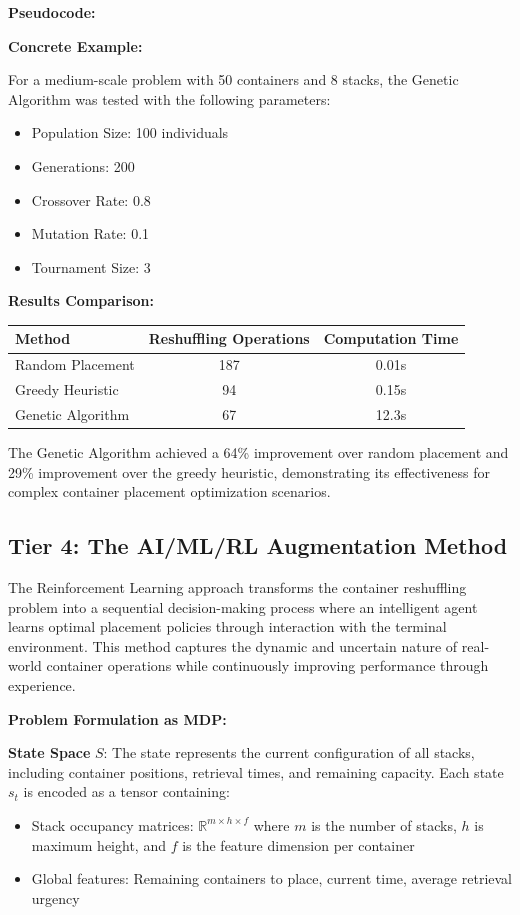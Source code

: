 \documentclass{article}
\begin{document}
\textbf{Pseudocode:}



\textbf{Concrete Example:}

For a medium-scale problem with 50 containers and 8 stacks, the Genetic Algorithm was tested with the following parameters:

\begin{itemize}
\item Population Size: 100 individuals
\item Generations: 200
\item Crossover Rate: 0.8
\item Mutation Rate: 0.1
\item Tournament Size: 3
\end{itemize}

\textbf{Results Comparison:}

\begin{center}
\begin{tabular}{lcc}
\toprule
Method & Reshuffling Operations & Computation Time \\
\midrule
Random Placement & 187 & 0.01s \\
Greedy Heuristic & 94 & 0.15s \\
Genetic Algorithm & 67 & 12.3s \\
\bottomrule
\end{tabular}
\end{center}

The Genetic Algorithm achieved a 64\% improvement over random placement and 29\% improvement over the greedy heuristic, demonstrating its effectiveness for complex container placement optimization scenarios.

\subsection{Tier 4: The AI/ML/RL Augmentation Method}

The Reinforcement Learning approach transforms the container reshuffling problem into a sequential decision-making process where an intelligent agent learns optimal placement policies through interaction with the terminal environment. This method captures the dynamic and uncertain nature of real-world container operations while continuously improving performance through experience.

\textbf{Problem Formulation as MDP:}

\textbf{State Space} $S$: The state represents the current configuration of all stacks, including container positions, retrieval times, and remaining capacity. Each state $s_t$ is encoded as a tensor containing:
\begin{itemize}
\item Stack occupancy matrices: $\mathbb{R}^{m \times h \times f}$ where $m$ is the number of stacks, $h$ is maximum height, and $f$ is the feature dimension per container
\item Global features: Remaining containers to place, current time, average retrieval urgency
\end{itemize}
\end{document}
